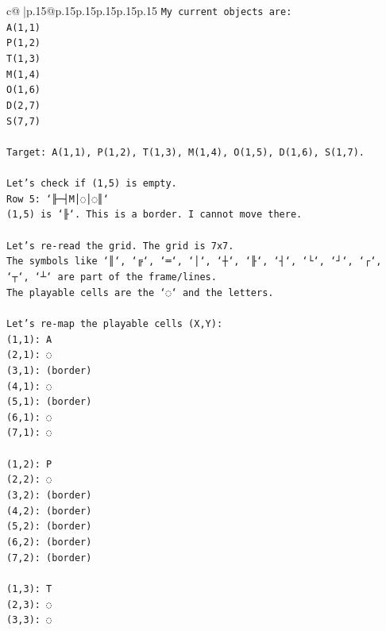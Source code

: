 \documentclass{article}
\begin{document}
{\begin{supertabular}{c@{$\;$}|p{.15\linewidth}@{}p{.15\linewidth}p{.15\linewidth}p{.15\linewidth}p{.15\linewidth}p{.15\linewidth}}
{{{\texttt{My current objects are:} \\
\texttt{A(1,1)} \\
\texttt{P(1,2)} \\
\texttt{T(1,3)} \\
\texttt{M(1,4)} \\
\texttt{O(1,6)} \\
\texttt{D(2,7)} \\
\texttt{S(7,7)} \\
\\ 
\texttt{Target: A(1,1), P(1,2), T(1,3), M(1,4), O(1,5), D(1,6), S(1,7).} \\
\\ 
\texttt{Let's check if (1,5) is empty.} \\
\texttt{Row 5: `╟─┤M│◌│◌║`} \\
\texttt{(1,5) is `╟`. This is a border. I cannot move there.} \\
\\ 
\texttt{Let's re{-}read the grid. The grid is 7x7.} \\
\texttt{The symbols like `║`, `╔`, `═`, `│`, `┼`, `╟`, `┤`, `└`, `┘`, `┌`, `┬`, `┴` are part of the frame/lines.} \\
\texttt{The playable cells are the `◌` and the letters.} \\
\\ 
\texttt{Let's re{-}map the playable cells (X,Y):} \\
\texttt{(1,1): A} \\
\texttt{(2,1): ◌} \\
\texttt{(3,1): (border)} \\
\texttt{(4,1): ◌} \\
\texttt{(5,1): (border)} \\
\texttt{(6,1): ◌} \\
\texttt{(7,1): ◌} \\
\\ 
\texttt{(1,2): P} \\
\texttt{(2,2): ◌} \\
\texttt{(3,2): (border)} \\
\texttt{(4,2): (border)} \\
\texttt{(5,2): (border)} \\
\texttt{(6,2): (border)} \\
\texttt{(7,2): (border)} \\
\\ 
\texttt{(1,3): T} \\
\texttt{(2,3): ◌} \\
\texttt{(3,3): ◌} \\
}}}
\end{supertabular}}
\end{document}
